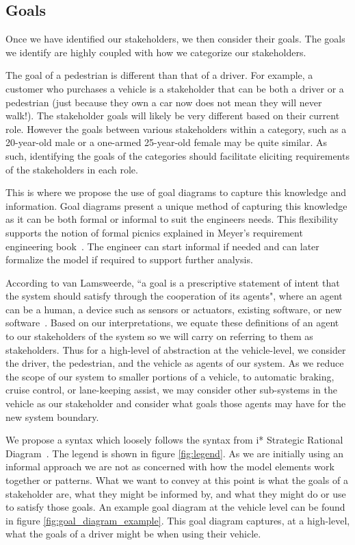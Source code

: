 \subsection{Goals}

Once we have identified our stakeholders, we then consider their goals. The goals we identify are highly coupled with how we categorize our stakeholders. 

The goal of a pedestrian is different than that of a driver. For example, a customer who purchases a vehicle is a stakeholder that can be both a driver or a pedestrian (just because they own a car now does not mean they will never walk!). The stakeholder goals will likely be very different based on their current role. However the goals between various stakeholders within a category, such as a 20-year-old male or a one-armed 25-year-old female may be quite similar. As such, identifying the goals of the categories should facilitate eliciting requirements of the stakeholders in each role.

This is where we propose the use of goal diagrams to capture this knowledge and information. Goal diagrams present a unique method of capturing this knowledge as it can be both formal or informal to suit the engineers needs. This flexibility supports the notion of formal picnics explained in Meyer's requirement engineering book~\cite{meyer2022handbook}. The engineer can start informal if needed and can later formalize the model if required to support further analysis. 

According to van Lamsweerde, ``a goal is a prescriptive statement of intent that the system should satisfy through the cooperation of its agents", where an agent can be a human, a device such as sensors or actuators, existing software, or new software~\cite{lamsweerde2009requirements}. Based on our interpretations, we equate these definitions of an agent to our stakeholders of the system so we will carry on referring to them as stakeholders. Thus for a high-level of abstraction at the vehicle-level, we consider the driver, the pedestrian, and the vehicle as agents of our system. As we reduce the scope of our system to smaller portions of a vehicle, to automatic braking, cruise control, or lane-keeping assist, we may consider other sub-systems in the vehicle as our stakeholder and consider what goals those agents may have for the new system boundary.

We propose a syntax which loosely follows the syntax from i* Strategic Rational Diagram~\cite{wautelet2016building, lopez2012specialization}. The legend is shown in figure \ref{fig:legend}. As we are initially using an informal approach we are not as concerned with how the model elements work together or patterns. What we want to convey at this point is what the goals of a stakeholder are, what they might be informed by, and what they might do or use to satisfy those goals. An example goal diagram at the vehicle level can be found in figure \ref{fig:goal_diagram_example}. This goal diagram captures, at a high-level, what the goals of a driver might be when using their vehicle. 

